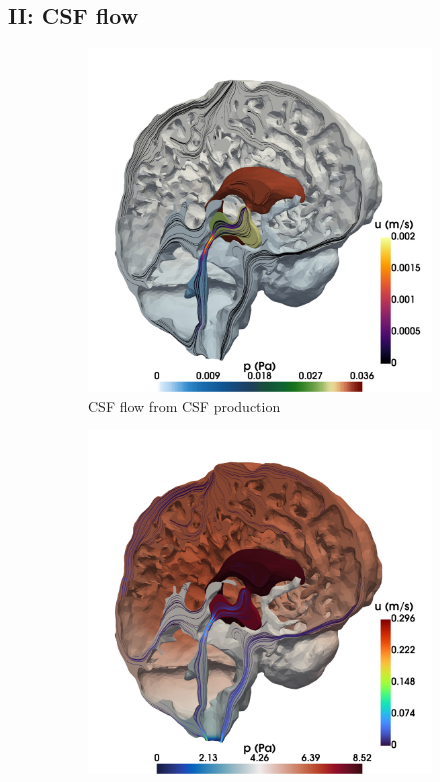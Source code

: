 \documentclass[fleqn,10pt]{wlscirep}
\newcommand{\draft}[1]{\textcolor{gray}{#1}}
\begin{document}
\draft{\lipsum[1]}

\subsection*{II: CSF flow}

\draft{\lipsum[1]}


\begin{figure}[h!]
\centering 
\begin{subfigure}[b]{0.33\textwidth}
\includegraphics[width = 1 \textwidth]{figures/csf_v.png}
\caption{CSF flow from CSF production}
\label{fig:csf_flow_prod}
\end{subfigure}
\begin{subfigure}[b]{0.33\textwidth}
\includegraphics[width = 1 \textwidth]{figures/cardiac_csf_v.png}

\end{subfigure}
\end{figure}
\end{document}
